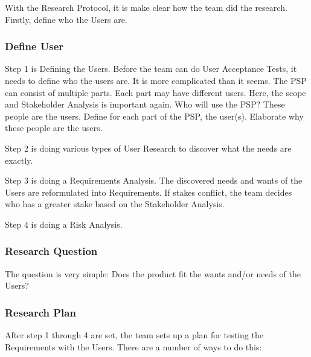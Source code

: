 \documentclass[10pt]{report}
\begin{document}
With the Research Protocol, it is make clear how the team did the research. Firstly, define who the Users are.

\subsubsection{Define User}

Step 1 is Defining the Users. Before the team can do User Acceptance Tests, it needs to define who the users are. It is more complicated than it seems. The PSP can consist of multiple parts. Each part may have different users. Here, the scope and Stakeholder Analysis is important again. Who will use the PSP? These people are the users. Define for each part of the PSP, the user(s). Elaborate why these people are the users.

Step 2 is doing various types of User Research to discover what the needs are exactly.

Step 3 is doing a Requirements Analysis. The discovered needs and wants of the Users are reformulated into Requirements. If stakes conflict, the team decides who has a greater stake based on the Stakeholder Analysis.

Step 4 is doing a Risk Analysis.

\subsubsection{Research Question}

The question is very simple: Does the product fit the wants and/or needs of the Users?

\subsubsection{Research Plan}

After step 1 through 4 are set, the team sets up a plan for testing the Requirements with the Users. There are a number of ways to do this:
\end{document}
